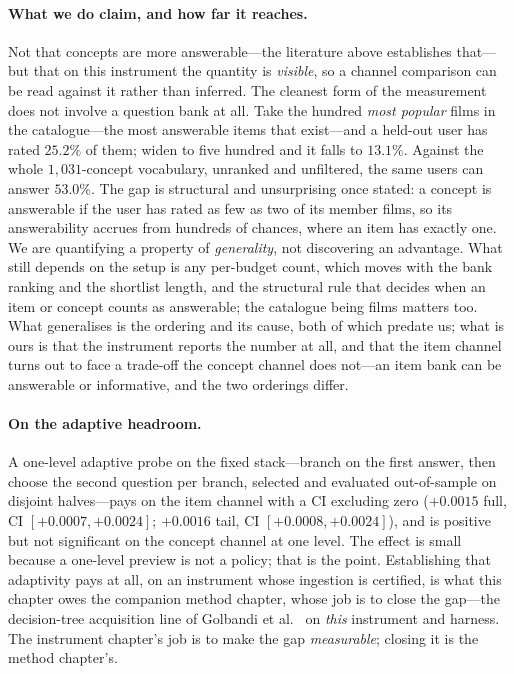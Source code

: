 \documentclass[11pt]{article}
\begin{document}
\paragraph{What we do claim, and how far it reaches.} Not that concepts are more answerable---the
literature above establishes that---but that on this instrument the quantity is \emph{visible}, so a
channel comparison can be read against it rather than inferred. The cleanest form of the measurement does
not involve a question bank at all. Take the hundred \emph{most popular} films in the catalogue---the most
answerable items that exist---and a held-out user has rated $25.2\%$ of them; widen to five hundred and it
falls to $13.1\%$. Against the whole $1{,}031$-concept vocabulary, unranked and unfiltered, the same users
can answer $53.0\%$. The gap is structural and unsurprising once stated: a concept is answerable if the
user has rated as few as two of its member films, so its answerability accrues from hundreds of chances,
where an item has exactly one. We are quantifying a property of \emph{generality}, not discovering an
advantage. What still depends on the setup is any per-budget count, which moves with the bank ranking and
the shortlist length, and the structural rule that decides when an item or concept counts as answerable;
the catalogue being films matters too. What generalises is the ordering and its cause, both of which predate us; what is ours is that
the instrument reports the number at all, and that the item channel turns out to face a trade-off the
concept channel does not---an item bank can be answerable or informative, and the two orderings differ.

\paragraph{On the adaptive headroom.} A one-level adaptive probe on the fixed stack---branch on the first answer, then choose the
second question per branch, selected and evaluated out-of-sample on disjoint halves---pays on the item channel with a
CI excluding zero ($+0.0015$ full, CI $[+0.0007,+0.0024]$; $+0.0016$ tail, CI $[+0.0008,+0.0024]$), and is positive
but not significant on the concept channel at one level. The effect is small because a one-level preview is not a
policy; that is the point. Establishing that adaptivity pays at all, on an instrument whose ingestion is certified, is
what this chapter owes the companion method chapter, whose job is to close the gap---the decision-tree acquisition
line of Golbandi et al.~\cite{golbandi2011adaptive} on \emph{this} instrument and harness. The instrument chapter's job
is to make the gap \emph{measurable}; closing it is the method chapter's.
\end{document}
